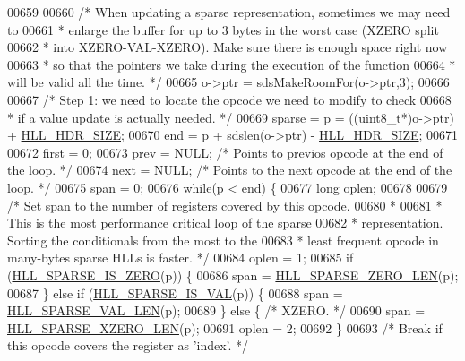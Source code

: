 \begin{DoxyCode}
{{00659 
00660     \textcolor{comment}{/* When updating a sparse representation, sometimes we may need to}
00661 \textcolor{comment}{     * enlarge the buffer for up to 3 bytes in the worst case (XZERO split}
00662 \textcolor{comment}{     * into XZERO-VAL-XZERO). Make sure there is enough space right now}
00663 \textcolor{comment}{     * so that the pointers we take during the execution of the function}
00664 \textcolor{comment}{     * will be valid all the time. */}
00665     o->ptr = sdsMakeRoomFor(o->ptr,3);
00666 
00667     \textcolor{comment}{/* Step 1: we need to locate the opcode we need to modify to check}
00668 \textcolor{comment}{     * if a value update is actually needed. */}
00669     sparse = p = ((uint8\_t*)o->ptr) + \hyperlink{hyperloglog_8c_af04dc163054c4c79b0e6c93057b4032f}{HLL\_HDR\_SIZE};
00670     end = p + sdslen(o->ptr) - \hyperlink{hyperloglog_8c_af04dc163054c4c79b0e6c93057b4032f}{HLL\_HDR\_SIZE};
00671 
00672     first = 0;
00673     prev = NULL; \textcolor{comment}{/* Points to previos opcode at the end of the loop. */}
00674     next = NULL; \textcolor{comment}{/* Points to the next opcode at the end of the loop. */}
00675     span = 0;
00676     \textcolor{keywordflow}{while}(p < end) \{
00677         \textcolor{keywordtype}{long} oplen;
00678 
00679         \textcolor{comment}{/* Set span to the number of registers covered by this opcode.}
00680 \textcolor{comment}{         *}
00681 \textcolor{comment}{         * This is the most performance critical loop of the sparse}
00682 \textcolor{comment}{         * representation. Sorting the conditionals from the most to the}
00683 \textcolor{comment}{         * least frequent opcode in many-bytes sparse HLLs is faster. */}
00684         oplen = 1;
00685         \textcolor{keywordflow}{if} (\hyperlink{hyperloglog_8c_a0b65ae2290df116ae4ed18188dffb5ad}{HLL\_SPARSE\_IS\_ZERO}(p)) \{
00686             span = \hyperlink{hyperloglog_8c_a0ed89a76f49a89991af87cce34c3260b}{HLL\_SPARSE\_ZERO\_LEN}(p);
00687         \} \textcolor{keywordflow}{else} \textcolor{keywordflow}{if} (\hyperlink{hyperloglog_8c_a14fe08c54ac70efe9d8db79b1b582890}{HLL\_SPARSE\_IS\_VAL}(p)) \{
00688             span = \hyperlink{hyperloglog_8c_a5c74b3b50c822c01c1976a72b84db12f}{HLL\_SPARSE\_VAL\_LEN}(p);
00689         \} \textcolor{keywordflow}{else} \{ \textcolor{comment}{/* XZERO. */}
00690             span = \hyperlink{hyperloglog_8c_a95fbeb27967ea46816fd354ddb59564e}{HLL\_SPARSE\_XZERO\_LEN}(p);
00691             oplen = 2;
00692         \}
00693         \textcolor{comment}{/* Break if this opcode covers the register as 'index'. */}
}}
\end{DoxyCode}
